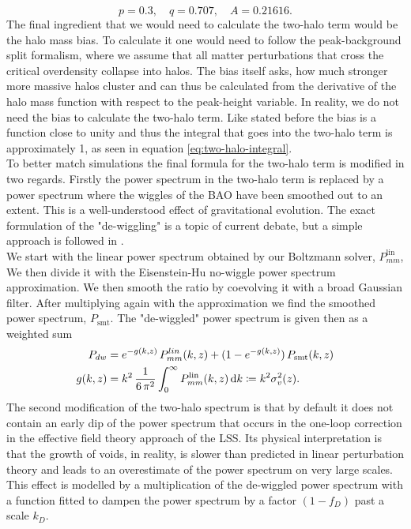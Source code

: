\documentclass[../main.tex]{subfiles}
\begin{document}
\begin{equation*}
    p=0.3,\quad q=0.707,\quad A=0.21616.
\end{equation*}
The final ingredient that we would need to calculate the two-halo term would be the halo mass bias. To calculate it one would need to follow the peak-background split formalism, where we assume that all matter perturbations that cross the critical overdensity collapse into halos. The bias itself asks, how much stronger more massive halos cluster and can thus be calculated from the derivative of the halo mass function with respect to the peak-height variable.
In reality, we do not need the bias to calculate the two-halo term. Like stated before the bias is a function close to unity and thus the integral that goes into the two-halo term is approximately 1, as seen in equation \ref{eq:two-halo-integral}.\\
To better match simulations the final formula for the two-halo term is modified in two regards. Firstly the power spectrum in the two-halo term is replaced by a power spectrum where the wiggles of the BAO have been smoothed out to an extent. This is a well-understood effect of gravitational evolution. The exact formulation of the "de-wiggling" is a topic of current debate, but a simple approach is followed in \hmcode.\\
We start with the linear power spectrum obtained by our Boltzmann solver, $P_{mm}^\mathrm{lin}$, We then divide it with the Eisenstein-Hu no-wiggle power spectrum approximation. We then smooth the ratio by coevolving it with a broad Gaussian filter. After multiplying again with the approximation we find the smoothed power spectrum, $P_\mathrm{smt}$. The "de-wiggled" power spectrum is given then as a weighted sum\begin{align}
    P_{dw} &= e^{-g(k,z)}\,P^{lin}_{mm}(k,z) + (1-e^{-g(k,z)})\,P_\mathrm{smt}(k,z)\\
 g(k,z) &= k^2\,\frac{1}{6\,\pi^2}\int_0^\infty P^\mathrm{lin}_{mm}(k,z)\,\mathrm{d} k\coloneqq k^2 \sigma_v^2(z).
 \end{align}
The second modification of the two-halo spectrum is that by default it does not contain an early dip of the power spectrum that occurs in the one-loop correction in the effective field theory approach of the LSS. Its physical interpretation is that the growth of voids, in reality, is slower than predicted in linear perturbation theory and leads to an overestimate of the power spectrum on very large scales. This effect is modelled by a multiplication of the de-wiggled power spectrum with a function fitted to dampen the power spectrum by a factor $(1-f_D)$ past a scale $k_D$.\\
\end{document}
